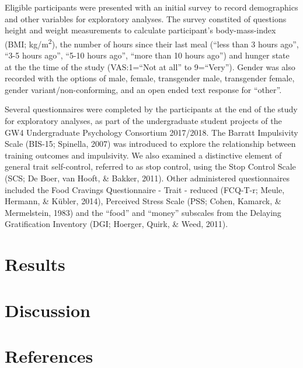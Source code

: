 \documentclass[man,floatsintext]{apa6}
\begin{document}
\par

Eligible participants were presented with an initial survey to record demographics and other variables for exploratory analyses. The survey constited of questions height and weight measurements to calculate participant's body-mass-index (BMI; kg/m\textsuperscript{2}), the number of hours since their last meal (\enquote{less than 3 hours ago}, \enquote{3-5 hours ago}, \enquote{5-10 hours ago}, \enquote{more than 10 hours ago}) and hunger state at the the time of the study (VAS:1=\enquote{Not at all} to 9=\enquote{Very}). Gender was also recorded with the options of male, female, transgender male, transgender female, gender variant/non-conforming, and an open ended text response for \enquote{other}.

\par

Several questionnaires were completed by the participants at the end of the study for exploratory analyses, as part of the undergraduate student projects of the GW4 Undergraduate Psychology Consortium 2017/2018. The Barratt Impulsivity Scale (BIS-15; Spinella, 2007) was introduced to explore the relationship between training outcomes and impulsivity. We also examined a distinctive element of general trait self-control, referred to as stop control, using the Stop Control Scale (SCS; De Boer, van Hooft, \& Bakker, 2011). Other administered questionnaires included the Food Cravings Questionnaire - Trait - reduced (FCQ-T-r; Meule, Hermann, \& Kübler, 2014), Perceived Stress Scale (PSS; Cohen, Kamarck, \& Mermelstein, 1983) and the \enquote{food} and \enquote{money} subscales from the Delaying Gratification Inventory (DGI; Hoerger, Quirk, \& Weed, 2011).

\hypertarget{results}{%
\section{Results}\label{results}}

\hypertarget{discussion}{%
\section{Discussion}\label{discussion}}

\newpage

\hypertarget{references}{%
\section{References}\label{references}}
\end{document}
